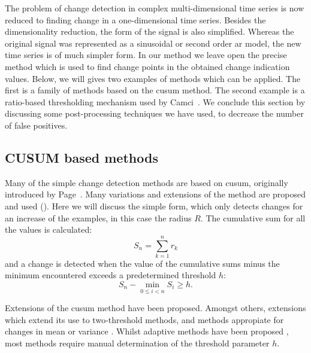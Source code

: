 The problem of change detection in complex multi-dimensional time series is now reduced to finding change in a one-dimensional time series.
Besides the dimensionality reduction, the form of the signal is also simplified.
Whereas the original signal was represented as a sinusoidal or second order \gls{ar} model, the new time series is of much simpler form.
In our method we leave open the precise method which is used to find change points in the obtained change indication values.
Below, we will gives two examples of methods which can be applied.
The first is a family of methods based on the \gls{cusum} method.
The second example is a ratio-based thresholding mechanism used by Camci~\cite{camci2010change}.
We conclude this section by discussing some post-processing techniques we have used, to decrease the number of false positives.

\subsection{CUSUM based methods}
Many of the simple change detection methods are based on \gls{cusum}, originally introduced by Page~\cite{page1954continuous}.
Many variations and extensions of the method are proposed and used (\cite{inclan1994use,alippi2006adaptive,hsu2007mosum}).
Here we will discuss the simple form, which only detects changes for an increase of the examples, in this case the radius $R$.
The cumulative sum for all the values is calculated:
\begin{equation}
  S_n = \sum_{k=1}^n r_k
\end{equation}
and a change is detected when the value of the cumulative sums minus the minimum encountered exceeds a predetermined threshold $h$:
\begin{equation}
  S_n - \operatorname*{min}_{0 \le i < n} S_i \ge h.
\end{equation}

Extensions of the \gls{cusum} method have been proposed.
Amongst others, extensions which extend its use to two-threshold methods, and methods appropiate for changes in mean or variance \cite{inclan1994use}.
Whilst adaptive methods have been proposed \cite{alippi2006adaptive}, most methods require manual determination of the threshold parameter $h$.

